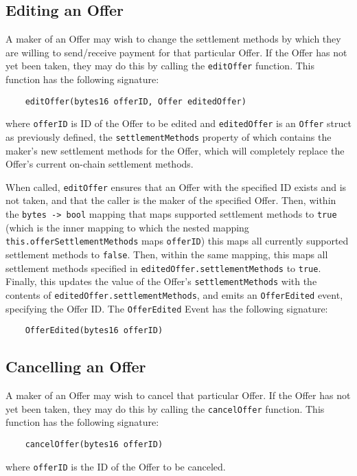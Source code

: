\documentclass[11pt]{article}
\begin{document}
    \subsection*{Editing an Offer}

    A maker of an Offer may wish to change the settlement methods by which they are willing to
    send/receive payment for that particular Offer.
    If the Offer has not yet been taken, they may do this by calling the \verb|editOffer| function.
    This function has the following signature:
    \begin{verbatim}
    editOffer(bytes16 offerID, Offer editedOffer)
    \end{verbatim}
    where \verb|offerID| is ID of the Offer to be edited and \verb|editedOffer| is an \verb|Offer|
    struct as previously defined, the \verb|settlementMethods| property of which contains the
    maker's new settlement methods for the Offer, which will completely replace the Offer's current
    on-chain settlement methods.

    When called, \verb|editOffer| ensures that an Offer with the specified ID exists and is not
    taken, and that the caller is the maker of the specified Offer.
    Then, within the \verb|bytes -> bool| mapping that maps supported settlement methods to
    \verb|true| (which is the inner mapping to which the nested mapping
    \verb|this.offerSettlementMethods| maps \verb|offerID|) this maps all currently supported
    settlement methods to \verb|false|.
    Then, within the same mapping, this maps all settlement methods specified in
    \verb|editedOffer.settlementMethods| to \verb|true|.
    Finally, this updates the value of the Offer's \verb|settlementMethods| with the contents of
    \verb|editedOffer.settlementMethods|, and emits an \verb|OfferEdited| event, specifying the
    Offer ID\@.
    The \verb|OfferEdited| Event has the following signature:
    \begin{verbatim}
    OfferEdited(bytes16 offerID)
    \end{verbatim}

    \subsection*{Cancelling an Offer}

    A maker of an Offer may wish to cancel that particular Offer.
    If the Offer has not yet been taken, they may do this by calling the \verb|cancelOffer|
    function.
    This function has the following signature:
    \begin{verbatim}
    cancelOffer(bytes16 offerID)
    \end{verbatim}
    where \verb|offerID|  is the ID of the Offer to be canceled.
\end{document}
